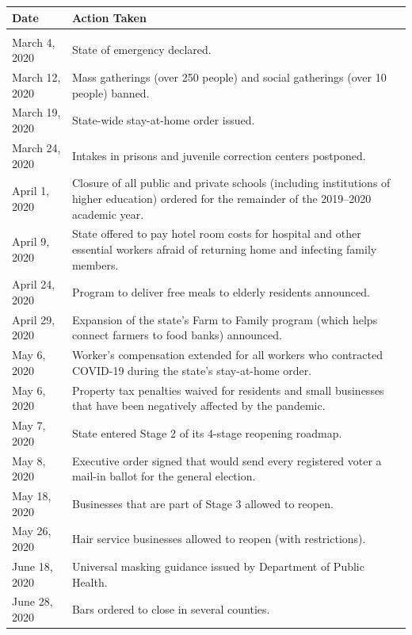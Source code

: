 \documentclass[11pt]{article}
\begin{document}
    \begin{table}[H]
        \begin{tabular}{p{.25\linewidth}|p{.75\linewidth}}
            Date 	& Action Taken \\
            \hline \\
            March 4, 2020 & 	State of emergency declared. \\
            March 12, 2020 & 	Mass gatherings (over 250 people) and social gatherings (over 10 people) banned. \\
            March 19, 2020 & 	State-wide stay-at-home order issued. \\
            March 24, 2020 & 	Intakes in prisons and juvenile correction centers postponed. \\
            April 1, 2020 & 	Closure of all public and private schools (including institutions of higher education) ordered for the remainder of the 2019–2020 academic year. \\
            April 9, 2020 & 	State offered to pay hotel room costs for hospital and other essential workers afraid of returning home and infecting family members. \\
            April 24, 2020 & 	Program to deliver free meals to elderly residents announced. \\
            April 29, 2020 & 	Expansion of the state's Farm to Family program (which helps connect farmers to food banks) announced. \\
            May 6, 2020 & 	Worker's compensation extended for all workers who contracted COVID-19 during the state's stay-at-home order. \\
            May 6, 2020 & 	Property tax penalties waived for residents and small businesses that have been negatively affected by the pandemic. \\
            May 7, 2020 & 	State entered Stage 2 of its 4-stage reopening roadmap. \\
            May 8, 2020 & 	Executive order signed that would send every registered voter a mail-in ballot for the general election. \\
            May 18, 2020 & 	Businesses that are part of Stage 3 allowed to reopen. \\
            May 26, 2020 & 	Hair service businesses allowed to reopen (with restrictions). \\
            June 18, 2020 & 	Universal masking guidance issued by Department of Public Health. \\
            June 28, 2020 & 	Bars ordered to close in several counties. \\

\end{tabular}
\end{table}
\end{document}
